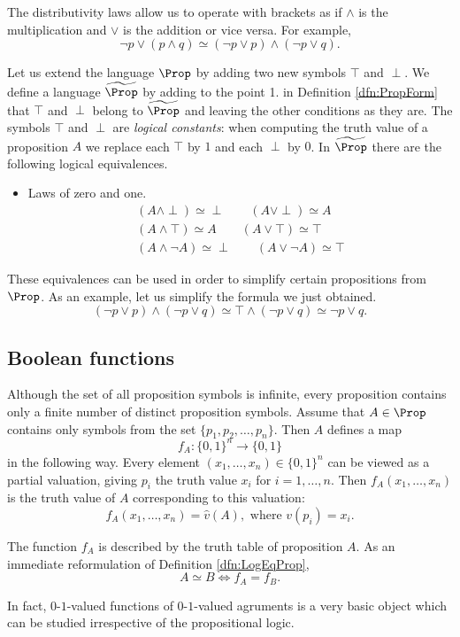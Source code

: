 \begin{page}
The distributivity laws allow us to operate with brackets as if $\wedge$ is the multiplication and $\vee$ is the addition
or vice versa.
For example,
\[
\neg p \vee (p \wedge q) \simeq (\neg p \vee p) \wedge (\neg p \vee q).
\]

Let us extend the language $\Prop$ by adding two new symbols $\top$ and $\perp$.
We define a language $\widetilde{\Prop}$ by adding to the point 1. in Definition \ref{dfn:PropForm} that $\top$ and $\perp$ belong to $\widetilde{\Prop}$
and leaving the other conditions as they are.
The symbols $\top$ and $\perp$ are \emph{logical constants}: when computing the truth value of a proposition $A$
we replace each $\top$ by $1$ and each $\perp$ by $0$.
In $\widetilde{\Prop}$ there are the following logical equivalences.
\begin{itemize}
\item
Laws of zero and one.
\begin{gather*}
(A \wedge \perp) \simeq \perp \qquad (A \vee \perp) \simeq A\\
(A \wedge \top) \simeq A \qquad (A \vee \top) \simeq \top\\
(A \wedge \neg A) \simeq \perp \qquad (A \vee \neg A) \simeq \top
\end{gather*}
\end{itemize}

These equivalences can be used in order to simplify certain propositions from $\Prop$.
As an example, let us simplify the formula we just obtained.
\[
(\neg p \vee p) \wedge (\neg p \vee q) \simeq \top \wedge (\neg p \vee q) \simeq \neg p \vee q.
\]




\end{page}

\begin{page}
\setcounter{section}{1}
\setcounter{subsection}{4}
\setcounter{dfn}{10}
\label{portion:382}

\subsection{Boolean functions}
Although the set of all proposition symbols is infinite,
every proposition contains only a finite number of distinct proposition symbols.
Assume that $A \in \Prop$ contains only symbols from the set $\{p_1, p_2, \ldots, p_n\}$.
Then $A$ defines a map
\[
f_A \colon \{0,1\}^n \to \{0,1\}
\]
in the following way.
Every element $(x_1, \ldots, x_n) \in \{0,1\}^n$ can be viewed as a partial valuation, giving $p_i$ the truth value $x_i$ for $i = 1, \ldots, n$.
Then $f_A(x_1, \ldots, x_n)$ is the truth value of $A$ corresponding to this valuation:
\[
f_A(x_1, \ldots, x_n) = \hat{v}(A), \text{ where } v(p_i) = x_i.
\]

The function $f_A$ is described by the truth table of proposition $A$.
As an immediate reformulation of Definition \ref{dfn:LogEqProp},
\[
A \simeq B \Leftrightarrow f_A = f_B.
\]

In fact, $0$-$1$-valued functions of $0$-$1$-valued agruments is a very basic object which can be studied irrespective of the propositional logic.

\end{page}

